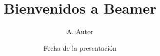 \documentclass{beamer}
\title{Bienvenidos a Beamer}
\author{A. Autor}
\institute{Universidad - Facultad}
\date{Fecha de la presentaci\'on}
\begin{document}
\begin{frame}
\titlepage %
\end{frame}
\end{document}
